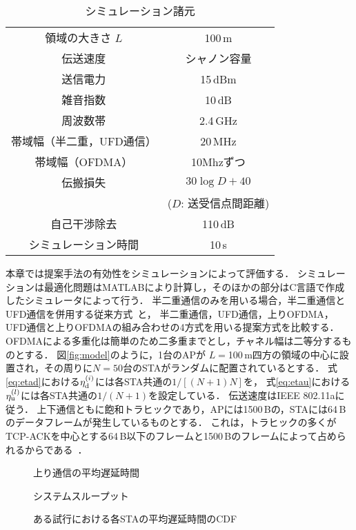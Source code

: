 \documentclass[technicalreport]{ieicej}
\begin{document}
	\begin{table}[t]
		\centering
		\caption{シミュレーション諸元}
		\label{tab:param}
		\begin{tabular}{cc} \hline
			領域の大きさ $L$ & 100\,m \\
			伝送速度 & シャノン容量 \\
			送信電力 & 15\,dBm \\
			雑音指数 & 10\,dB \\
			周波数帯 & 2.4\,GHz \\
			帯域幅（半二重，UFD通信） & 20\,MHz \\
			帯域幅（OFDMA）& 10Mhzずつ \\
			伝搬損失 & $30\log D + 40$\\
			&($D$: 送受信点間距離)\\
			自己干渉除去 & 110\,dB \\
			シミュレーション時間 & 10\,s \\\hline
		\end{tabular}
	\end{table}

	本章では提案手法の有効性をシミュレーションによって評価する．
	シミュレーションは最適化問題はMATLABにより計算し，そのほかの部分はC言語で作成したシミュレータによって行う．
	半二重通信のみを用いる場合，半二重通信とUFD通信を併用する従来方式~\cite{promac_fair}と，
	半二重通信，UFD通信，上りOFDMA，UFD通信と上りOFDMAの組み合わせの4方式を用いる提案方式を比較する．
	OFDMAによる多重化は簡単のため二多重までとし，チャネル幅は二等分するものとする．
	図\ref{fig:model}のように，1台のAPが $L=$100\,m四方の領域の中心に設置され，その周りに$N=50$台のSTAがランダムに配置されているとする．
	式\eqref{eq:etad}における$\eta_{\rm d}^{(i)}$には各STA共通の$1/[(N+1)N]$を，
	式\eqref{eq:etau}における$\eta_{\rm u}^{(l)}$には各STA共通の$1/(N+1)$を設定している．
	伝送速度はIEEE 802.11aに従う．
	上下通信ともに飽和トラヒックであり，APには1500\,Bの，STAには64\,Bのデータフレームが発生しているものとする．
	これは，トラヒックの多くがTCP-ACKを中心とする64\,B以下のフレームと1500\,Bのフレームによって占められるからである~\cite{traffic}．

		\begin{figure}[t]
			\centering
			\caption{上り通信の平均遅延時間}
			\label{fig:delay}
		\end{figure}
		\begin{figure}[t]
			\centering
			\caption{システムスループット}
			\label{fig:thr}
		\end{figure}
		\begin{figure}[t]
			\centering
			\caption{ある試行における各STAの平均遅延時間のCDF}
			\label{fig:cdf}
		\end{figure}
\end{document}
